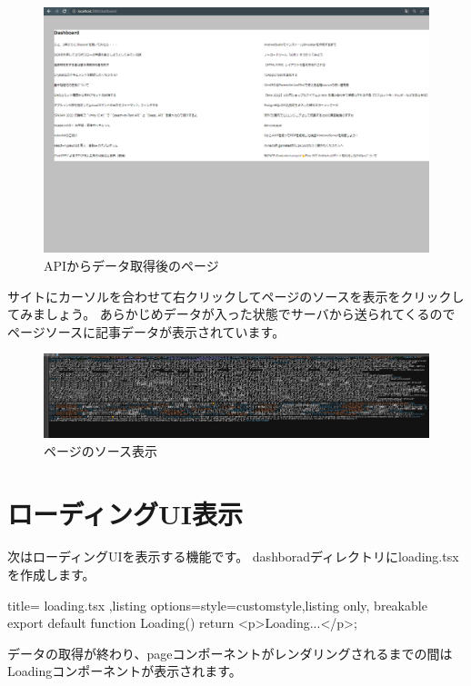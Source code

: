 \begin{figure}[H]
  \centering
  \includegraphics[width=12cm]{./image/03-Tech/chap4/06.png}
  \caption{APIからデータ取得後のページ}
\end{figure}


サイトにカーソルを合わせて右クリックしてページのソースを表示をクリックしてみましょう。
あらかじめデータが入った状態でサーバから送られてくるのでページソースに記事データが表示されています。

\begin{figure}[H]
  \centering
  \includegraphics[width=12cm]{./image/03-Tech/chap4/05.png}
  \caption{ページのソース表示}
\end{figure}

\section{ローディングUI表示}

次はローディングUIを表示する機能です。
dashboradディレクトリにloading.tsxを作成します。

\begin{tcblisting}{title={
        loading.tsx
      },listing options={style=customstyle},listing only, breakable}
  export default function Loading() {
    return <p>Loading...</p>;
  }
\end{tcblisting}


データの取得が終わり、pageコンポーネントがレンダリングされるまでの間はLoadingコンポーネントが表示されます。

